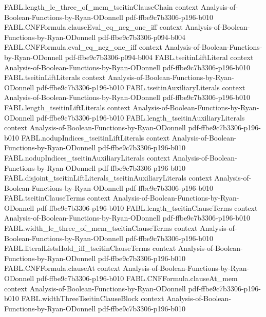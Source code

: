 \begin{theorem}
  {FABL.length_le_three_of_mem_tseitinClauseChain}
  {context}
  {Analysis-of-Boolean-Functions-by-Ryan-ODonnell}
  {pdf-ffbe9c7b3306-p196-b010}
\proofstep
  {FABL.CNFFormula.clauseEval_eq_neg_one_iff}
  {context}
  {Analysis-of-Boolean-Functions-by-Ryan-ODonnell}
  {pdf-ffbe9c7b3306-p094-b004}
\proofstep
  {FABL.CNFFormula.eval_eq_neg_one_iff}
  {context}
  {Analysis-of-Boolean-Functions-by-Ryan-ODonnell}
  {pdf-ffbe9c7b3306-p094-b004}
\proofstep
  {FABL.tseitinLiftLiteral}
  {context}
  {Analysis-of-Boolean-Functions-by-Ryan-ODonnell}
  {pdf-ffbe9c7b3306-p196-b010}
\proofstep
  {FABL.tseitinLiftLiterals}
  {context}
  {Analysis-of-Boolean-Functions-by-Ryan-ODonnell}
  {pdf-ffbe9c7b3306-p196-b010}
\proofstep
  {FABL.tseitinAuxiliaryLiterals}
  {context}
  {Analysis-of-Boolean-Functions-by-Ryan-ODonnell}
  {pdf-ffbe9c7b3306-p196-b010}
\proofstep
  {FABL.length_tseitinLiftLiterals}
  {context}
  {Analysis-of-Boolean-Functions-by-Ryan-ODonnell}
  {pdf-ffbe9c7b3306-p196-b010}
\proofstep
  {FABL.length_tseitinAuxiliaryLiterals}
  {context}
  {Analysis-of-Boolean-Functions-by-Ryan-ODonnell}
  {pdf-ffbe9c7b3306-p196-b010}
\proofstep
  {FABL.nodupIndices_tseitinLiftLiterals}
  {context}
  {Analysis-of-Boolean-Functions-by-Ryan-ODonnell}
  {pdf-ffbe9c7b3306-p196-b010}
\proofstep
  {FABL.nodupIndices_tseitinAuxiliaryLiterals}
  {context}
  {Analysis-of-Boolean-Functions-by-Ryan-ODonnell}
  {pdf-ffbe9c7b3306-p196-b010}
\proofstep
  {FABL.disjoint_tseitinLiftLiterals_tseitinAuxiliaryLiterals}
  {context}
  {Analysis-of-Boolean-Functions-by-Ryan-ODonnell}
  {pdf-ffbe9c7b3306-p196-b010}
\proofstep
  {FABL.tseitinClauseTerms}
  {context}
  {Analysis-of-Boolean-Functions-by-Ryan-ODonnell}
  {pdf-ffbe9c7b3306-p196-b010}
\proofstep
  {FABL.length_tseitinClauseTerms}
  {context}
  {Analysis-of-Boolean-Functions-by-Ryan-ODonnell}
  {pdf-ffbe9c7b3306-p196-b010}
\proofstep
  {FABL.width_le_three_of_mem_tseitinClauseTerms}
  {context}
  {Analysis-of-Boolean-Functions-by-Ryan-ODonnell}
  {pdf-ffbe9c7b3306-p196-b010}
\proofstep
  {FABL.literalListsHold_iff_tseitinClauseTerms}
  {context}
  {Analysis-of-Boolean-Functions-by-Ryan-ODonnell}
  {pdf-ffbe9c7b3306-p196-b010}
\proofstep
  {FABL.CNFFormula.clauseAt}
  {context}
  {Analysis-of-Boolean-Functions-by-Ryan-ODonnell}
  {pdf-ffbe9c7b3306-p196-b010}
\proofstep
  {FABL.CNFFormula.clauseAt_mem}
  {context}
  {Analysis-of-Boolean-Functions-by-Ryan-ODonnell}
  {pdf-ffbe9c7b3306-p196-b010}
\proofstep
  {FABL.widthThreeTseitinClauseBlock}
  {context}
  {Analysis-of-Boolean-Functions-by-Ryan-ODonnell}
  {pdf-ffbe9c7b3306-p196-b010}
\proofstep

\end{theorem}
